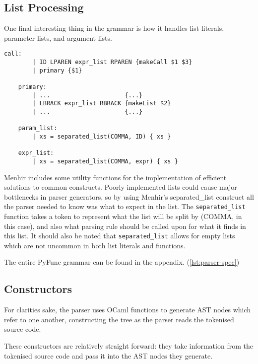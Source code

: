 \documentclass{l4proj}
\begin{document}
\subsection*{List Processing}
    
    One final interesting thing in the grammar is how it handles list literals, parameter lists, and argument lists.
    \begin{lstlisting}[caption=PyFunc's Parser grammar for handling list literals.]
    call:
        | ID LPAREN expr_list RPAREN {makeCall $1 $3}
        | primary {$1}
    
    primary:
        | ...                     {...}
        | LBRACK expr_list RBRACK {makeList $2}
        | ...                     {...}

    param_list:
        | xs = separated_list(COMMA, ID) { xs }

    expr_list:
        | xs = separated_list(COMMA, expr) { xs }
    \end{lstlisting}

    Menhir includes some utility functions for the implementation of efficient solutions to common constructs.
    Poorly implemented lists could cause major bottlenecks in parser generators, so by using Menhir's separated\_list construct all the parser needed to know was what to expect in the list.
    The \texttt{separated\_list} function takes a token to represent what the list will be split by (COMMA, in this case), and also what parsing rule should be called upon for what it finds in this list.
    It should also be noted that \texttt{separated\_list} allows for empty lists which are not uncommon in both list literals and functions.


The entire PyFunc grammar can be found in the appendix. (\ref{lst:parser-spec})
\newpage
\subsection{Constructors}

For clarities sake, the parser uses OCaml functions to generate AST nodes which refer to one another, constructing the tree as the parser reads the tokenised source code.

These constructors are relatively straight forward: they take information from the tokenised source code and pass it into the AST nodes they generate.
\end{document}
